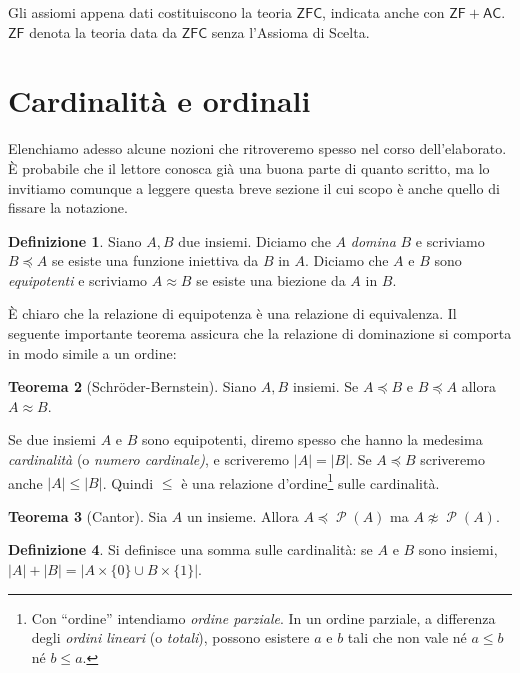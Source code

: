 \documentclass[12pt,a4paper]{report}
\theoremstyle{definition}
\newtheorem{teo}{Teorema}[section]  %
\newtheorem{defn}[teo]{Definizione}  %
\theoremstyle{num.custom-title}
\DeclareMathOperator{\PP}{\mathcal{P}}
\newcommand{\ZF}{\ensuremath{\mathsf{ZF}}\xspace}
\newcommand{\ZFC}{\ensuremath{\mathsf{ZFC}}\xspace}
\begin{document}
\noindent Gli assiomi appena dati costituiscono la teoria \ZFC, indicata anche con $\mathsf{ZF+AC}$. \ZF denota la teoria data da \ZFC senza l'Assioma di Scelta.

\section{Cardinalità e ordinali}

Elenchiamo adesso alcune nozioni che ritroveremo spesso nel corso dell'elaborato. È probabile che il lettore conosca già una buona parte di quanto scritto, ma lo invitiamo comunque a leggere questa breve sezione il cui scopo è anche quello di fissare la notazione.

\begin{defn}
Siano $A, B$ due insiemi. Diciamo che $A$ \emph{domina} $B$ e scriviamo $B \preceq A$ se esiste una funzione iniettiva da $B$ in $A$. Diciamo che $A$ e $B$ sono \emph{equipotenti} e scriviamo $A \approx B$ se esiste una biezione da $A$ in $B$.
\end{defn}

È chiaro che la relazione di equipotenza è una relazione di equivalenza. Il seguente importante teorema assicura che la relazione di dominazione si comporta in modo simile a un ordine:

\begin{teo}[Schröder-Bernstein]
Siano $A,B$ insiemi. Se $A \preceq B$ e $B \preceq A$ allora $A \approx B$.
\end{teo}

Se due insiemi $A$ e $B$ sono equipotenti, diremo spesso che hanno la medesima \emph{cardinalità} (o \emph{numero cardinale)}, e scriveremo $|A|=|B|$. Se $A \preceq B$ scriveremo anche $|A| \leq |B|$. Quindi $\leq$ è una relazione d'ordine\footnote{Con ``ordine'' intendiamo \emph{ordine parziale}. In un ordine parziale, a differenza degli \emph{ordini lineari} (o \emph{totali}), possono esistere $a$ e $b$ tali che non vale né $a \leq b$ né $b \leq a$.} sulle cardinalità.

\begin{teo}[Cantor]
Sia $A$ un insieme. Allora $A \preceq \PP(A)$ ma $A \not\approx \PP(A)$.
\end{teo}

\begin{defn}
Si definisce una somma sulle cardinalità: se $A$ e $B$ sono insiemi, $|A|+|B|=|A \times \{0\} \cup B \times \{1\}|$.
\end{defn}
\end{document}
